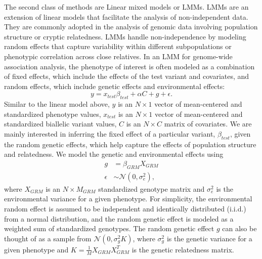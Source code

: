 The second class of methods are Linear mixed models or LMMs. LMMs are an extension of linear models that facilitate the analysis of non-independent data. They are commonly adopted in the analysis of genomic data involving population structure or cryptic relatedness. LMMs handle non-independence by modeling random effects that capture variability within different subpopulations or phenotypic correlation across close relatives. In an LMM for genome-wide association analysis, the phenotype of interest is often modeled as a combination of fixed effects, which include the effects of the test variant and covariates, and random effects, which include genetic effects and environmental effects:
\begin{equation}
    y = x_{test}\beta_{test} + \alpha C + g + \epsilon \label{lmm}.
\end{equation}
Similar to the linear model above, $y$ is an $N \times 1$ vector of mean-centered and standardized phenotype values, $x_{test}$ is an $N \times 1$ vector of mean-centered and standardized biallelic variant values, $C$ is an $N \times C$ matrix of covariates.
%
We are mainly interested in inferring the fixed effect of a particular variant, $\beta_{test}$, given the random genetic effects, which help capture the effects of population structure and relatedness.
%
We model the genetic and environmental effects using
\begin{align}
    g &= \beta_{GRM} X_{GRM} \nonumber \\
    \epsilon &\sim  \mathcal{N}(0, \sigma^2_e) \label{lmm-1},
\end{align}
where $X_{GRM}$ is an $N \times M_{GRM}$ standardized genotype matrix and $\sigma^2_e$ is the environmental variance for a given phenotype.
%
For simplicity, the environmental random effect is assumed to be independent and identically distributed (i.i.d.) from a normal distribution, and the random genetic effect is modeled as a weighted sum of standardized genotypes. The random genetic effect $g$ can also be thought of as a sample from $\mathcal{N}(0, \sigma^2_g K)$, where $\sigma^2_g$ is the genetic variance for a given phenotype and $K = \frac{1}{M}X_{GRM}X_{GRM}^T$ is the genetic relatedness matrix.




